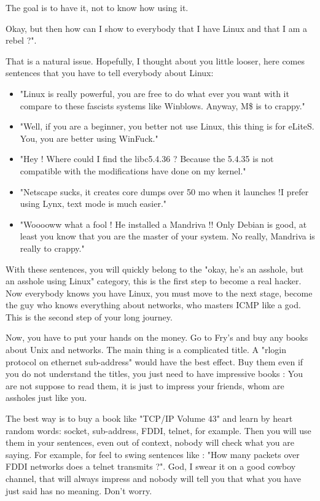 The goal is to have it, not to know how using it.

Okay, but then how can I show to everybody that I have Linux and that I am a rebel ?". 

That is a natural issue. Hopefully, I thought about you little looser, here comes sentences that you have to tell everybody about Linux:

\begin{itemize}
	\item "Linux is really powerful, you are free to do what ever you want with it compare to these fascists systems like Winblows. Anyway, M\$ is to crappy."

	\item "Well, if you are a beginner, you better not use Linux, this thing is for eLiteS. You, you are better using WinFuck."

	\item "Hey ! Where could I find the libc5.4.36 ? Because the 5.4.35 is not compatible with the modifications have done on my kernel."

	\item "Netscape sucks, it creates core dumps over 50 mo when it launches !I prefer using Lynx, text mode is much easier."

	\item "Wooooww what a fool ! He installed a Mandriva !! Only Debian is good, at least you know that you are the master of your system. No really, Mandriva is really to crappy."
\end{itemize}

With these sentences, you will quickly belong to the "okay, he's an asshole, but an asshole using Linux" category, this is the first step to become a real hacker. Now everybody knows you have Linux, you must move to the next stage, become the guy who knows everything about networks, who masters ICMP like a god. This is the second step of your long journey.

Now, you have to put your hands on the money. Go to Fry's and buy any books about Unix and networks. The main thing is a complicated title. A "rlogin protocol on ethernet sub-address" would have the best effect. Buy them even if you do not understand the titles, you just need to have impressive books : You are not suppose to read them, it is just to impress your friends, whom are assholes just like you.

The best way is to buy a book like "TCP/IP Volume 43" and learn by heart random words: socket, sub-address, FDDI, telnet, for example. Then you will use them in your sentences, even out of context, nobody will check what you are saying. For example, for feel to swing sentences like : "How many packets over FDDI networks does a telnet transmits ?". God, I swear it on a good cowboy channel, that will always impress and nobody will tell you that what you have just said has no meaning. Don't worry.

